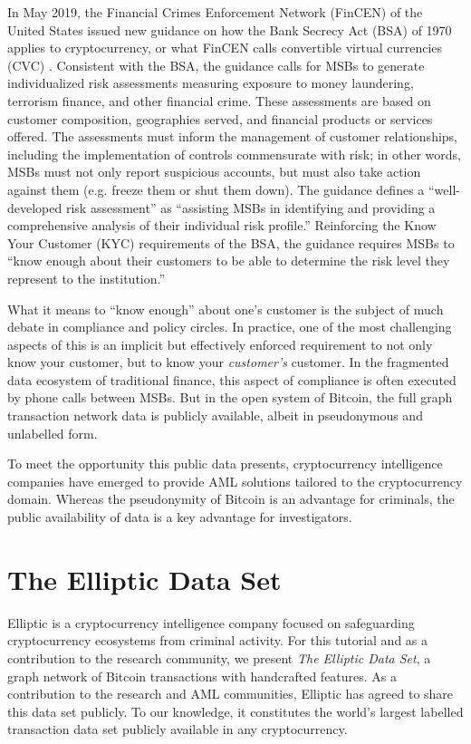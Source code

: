 \documentclass[sigconf,submission]{acmart}
\begin{document}
In May 2019, the Financial Crimes Enforcement Network (FinCEN) of the United States issued new guidance on how the Bank Secrecy Act (BSA) of 1970 applies to cryptocurrency, or what FinCEN calls convertible virtual currencies (CVC) \cite{FinCEN}. Consistent with the BSA, the guidance calls for MSBs to generate individualized risk assessments measuring exposure to money laundering, terrorism finance, and other financial crime. These assessments are based on customer composition, geographies served, and financial products or services offered. The assessments must inform the management of customer relationships, including the implementation of controls commensurate with risk; in other words, MSBs must not only report suspicious accounts, but must also take action against them (e.g. freeze them or shut them down). The guidance defines a ``well-developed risk assessment'' as ``assisting MSBs in identifying and providing a comprehensive analysis of their individual risk profile.'' Reinforcing the Know Your Customer (KYC) requirements of the BSA, the guidance requires MSBs to ``know enough about their customers to be able to determine the risk level they represent to the institution.''

What it means to ``know enough'' about one's customer is the subject of much debate in compliance and policy circles. In practice, one of the most challenging aspects of this is an implicit but effectively enforced requirement to not only know your customer, but to know your \textit{customer's} customer. In the fragmented data ecosystem of traditional finance, this aspect of compliance is often executed by phone calls between MSBs. But in the open system of Bitcoin, the full graph transaction network data is publicly available, albeit in pseudonymous and unlabelled form.

To meet the opportunity this public data presents, cryptocurrency intelligence companies have emerged to provide AML solutions tailored to the cryptocurrency domain. Whereas the pseudonymity of Bitcoin is an advantage for criminals, the public availability of data is a key advantage for investigators.

\section{The Elliptic Data Set}
\label{dataset}

Elliptic is a cryptocurrency intelligence company focused on safeguarding cryptocurrency ecosystems from criminal activity. For this tutorial and as a contribution to the research community, we present \textit{The Elliptic Data Set}, a graph network of Bitcoin transactions with handcrafted features. As a contribution to the research and AML communities, Elliptic has agreed to share this data set publicly. To our knowledge, it constitutes the world's largest labelled transaction data set publicly available in any cryptocurrency.
\end{document}
